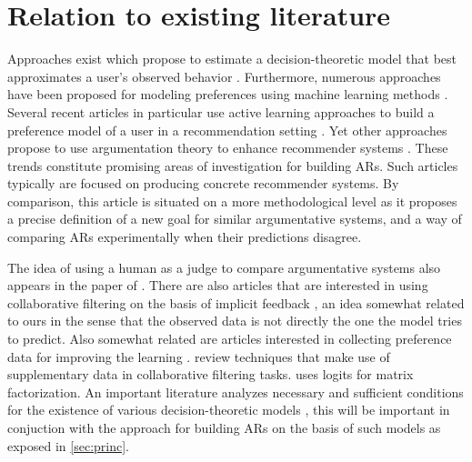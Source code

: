 \documentclass[version=3.21, pagesize, twoside=off, bibliography=totoc, DIV=calc, fontsize=12pt, a4paper, french, english]{scrartcl}
\begin{document}
\section{Relation to existing literature}
\label{sec:litt}
Approaches exist which propose to estimate a decision-theoretic model that best approximates a user’s observed behavior \citep{greco_trends_2010, sobrie_learning_2018}. 
Furthermore, numerous approaches have been proposed for modeling preferences using machine learning methods \citep{furnkranz_preference_2010}. 
Several recent articles in particular use active learning approaches to build a preference model of a user in a recommendation setting \citep{teso_constructive_2016, teso_coactive_2017, dragone_constructive_2018, erculiani_automating_2018, dragone_no_2018}.
Yet other approaches propose to use argumentation theory \citep{besnard_elements_2008} to enhance recommender systems \citep{chesnevar_empowering_2009, rago_argumentation-based_2018}. These trends constitute promising areas of investigation for building \acp{AR}. Such articles typically are focused on producing concrete recommender systems. By comparison, this article is situated on a more methodological level as it proposes a precise definition of a new goal for similar argumentative systems, and a way of comparing \acp{AR} experimentally when their predictions disagree.

The idea of using a human as a judge to compare argumentative systems also appears in the paper of \citet{irving_ai_2018}.
There are also articles that are interested in using collaborative filtering on the basis of implicit feedback \citep{rendle_bpr:_2009, hu_collaborative_2008}, an idea somewhat related to ours in the sense that the observed data is not directly the one the model tries to predict.
Also somewhat related are articles interested in collecting preference data for improving the learning \citep{sepliarskaia_preference_2018}. \citet{chen_attribute-aware_2018} review techniques that make use of supplementary data in collaborative filtering tasks.
\citet{johnson_logistic_2014} uses logits for matrix factorization. 
An important literature analyzes necessary and sufficient conditions for the existence of various decision-theoretic models \citep{krantz_foundations_1971, gonzales_additive_1996, bouyssou_consolidated_2015}, this will be important in conjuction with the approach for building \acp{AR} on the basis of such models as exposed in \cref{sec:princ}.
\end{document}

